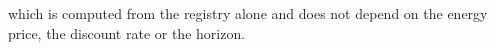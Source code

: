 which is computed from the registry alone and does not depend on the energy price, the discount rate or the horizon.
